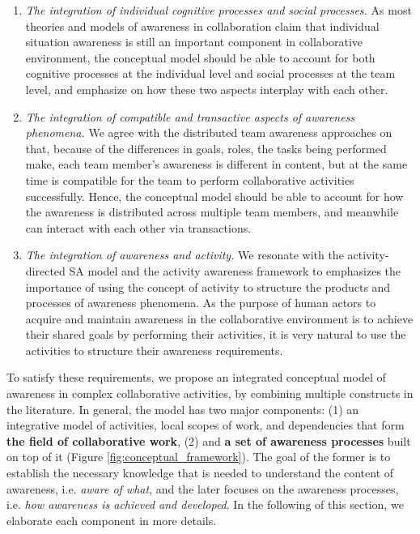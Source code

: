 \begin{enumerate}
	\item \emph{The integration of individual cognitive processes and social processes.} As most theories and models of awareness in collaboration claim that individual situation awareness is still an important component in collaborative environment, the conceptual model should be able to account for both cognitive processes at the individual level and social processes at the team level, and emphasize on how these two aspects interplay with each other. 
	\item \emph{The integration of compatible and transactive aspects of awareness phenomena.} We agree with the distributed team awareness approaches \cite{Salmon2010} on that, because of the differences in goals, roles, the tasks being performed make, each team member’s awareness is different in content, but at the same time is compatible for the team to perform collaborative activities successfully. Hence, the conceptual model should be able to account for how the awareness is distributed across multiple team members, and meanwhile can interact with each other via transactions. 
	\item \emph{The integration of awareness and activity.} We resonate with the activity-directed SA model \cite{Bedny1999} and the activity awareness framework \cite{carroll2003a} to emphasizes the importance of using the concept of activity to structure the products and processes of awareness phenomena. As the purpose of human actors to acquire and maintain awareness in the collaborative environment is to achieve their shared goals by performing their activities, it is very natural to use the activities to structure their awareness requirements. 
\end{enumerate}

To satisfy these requirements, we propose an integrated conceptual model of awareness in complex collaborative activities, by combining multiple constructs in the literature. In general, the model has two major components: (1) an integrative model of activities, local scopes of work, and dependencies that form \textbf{the field of collaborative work}, (2) and \textbf{a set of awareness processes} built on top of it (Figure \ref{fig:conceptual_framework}). The goal of the former is to establish the necessary knowledge that is needed to understand the content of awareness, i.e. \emph{aware of what}, and the later focuses on the awareness processes, i.e. \emph{how awareness is achieved and developed}. In the following of this section, we elaborate each component in more details.

